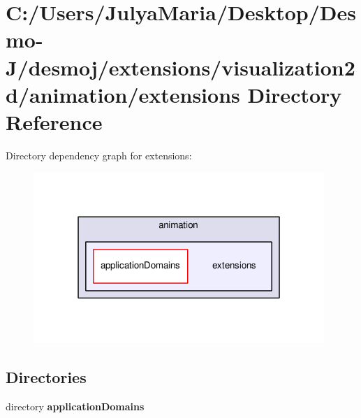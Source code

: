 \section{C\-:/\-Users/\-Julya\-Maria/\-Desktop/\-Desmo-\/\-J/desmoj/extensions/visualization2d/animation/extensions Directory Reference}
\label{dir_7a4168aa403f7b415d45626f6f3e83ed}
Directory dependency graph for extensions\-:
\nopagebreak
\begin{figure}[H]
\begin{center}
\leavevmode
\includegraphics[width=312pt]{dir_7a4168aa403f7b415d45626f6f3e83ed_dep}
\end{center}
\end{figure}
\subsection*{Directories}
\begin{DoxyCompactItemize}
\item 
directory {\bf application\-Domains}
\end{DoxyCompactItemize}
